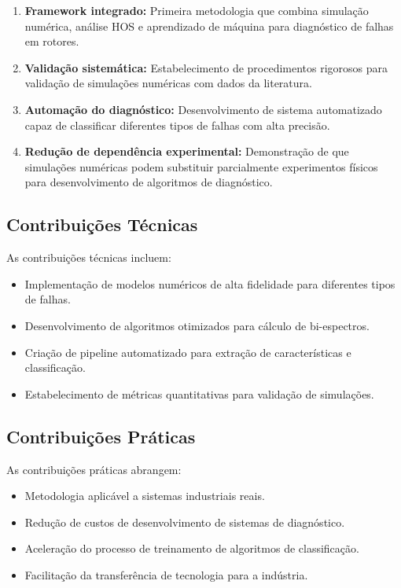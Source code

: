 \begin{enumerate}
    \item \textbf{Framework integrado:} Primeira metodologia que combina simulação numérica, análise HOS e aprendizado de máquina para diagnóstico de falhas em rotores.
    
    \item \textbf{Validação sistemática:} Estabelecimento de procedimentos rigorosos para validação de simulações numéricas com dados da literatura.
    
    \item \textbf{Automação do diagnóstico:} Desenvolvimento de sistema automatizado capaz de classificar diferentes tipos de falhas com alta precisão.
    
    \item \textbf{Redução de dependência experimental:} Demonstração de que simulações numéricas podem substituir parcialmente experimentos físicos para desenvolvimento de algoritmos de diagnóstico.
\end{enumerate}

\subsection{Contribuições Técnicas}

As contribuições técnicas incluem:

\begin{itemize}
    \item Implementação de modelos numéricos de alta fidelidade para diferentes tipos de falhas.
    \item Desenvolvimento de algoritmos otimizados para cálculo de bi-espectros.
    \item Criação de pipeline automatizado para extração de características e classificação.
    \item Estabelecimento de métricas quantitativas para validação de simulações.
\end{itemize}

\subsection{Contribuições Práticas}

As contribuições práticas abrangem:

\begin{itemize}
    \item Metodologia aplicável a sistemas industriais reais.
    \item Redução de custos de desenvolvimento de sistemas de diagnóstico.
    \item Aceleração do processo de treinamento de algoritmos de classificação.
    \item Facilitação da transferência de tecnologia para a indústria.
\end{itemize}


